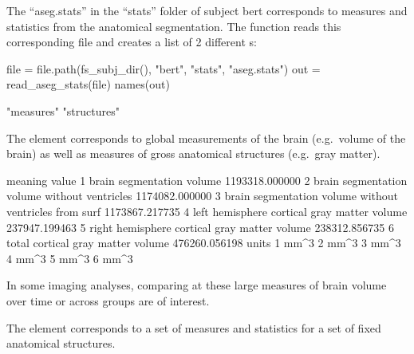 The ``aseg.stats'' in the ``stats'' folder of subject bert corresponds
to measures and statistics from the anatomical segmentation. The
 function reads this corresponding file and
creates a list of 2 different s:

\begin{Schunk}
\begin{Sinput}
file = file.path(fs_subj_dir(), "bert", "stats", "aseg.stats")
out = read_aseg_stats(file)
names(out)
\end{Sinput}
\begin{Soutput}
[1] "measures"   "structures"
\end{Soutput}
\end{Schunk}

The  element corresponds to global measurements of the
brain (e.g.~volume of the brain) as well as measures of gross anatomical
structures (e.g.~gray matter).

\begin{Schunk}
\begin{Soutput}
                                                 meaning          value
1                              brain segmentation volume 1193318.000000
2           brain segmentation volume without ventricles 1174082.000000
3 brain segmentation volume without ventricles from surf 1173867.217735
4            left hemisphere cortical gray matter volume  237947.199463
5           right hemisphere cortical gray matter volume  238312.856735
6                      total cortical gray matter volume  476260.056198
  units
1  mm^3
2  mm^3
3  mm^3
4  mm^3
5  mm^3
6  mm^3
\end{Soutput}
\end{Schunk}

In some imaging analyses, comparing at these large measures of brain volume over time or across groups are of interest.  

The  element corresponds to a set of measures and statistics for a set of fixed anatomical structures.

